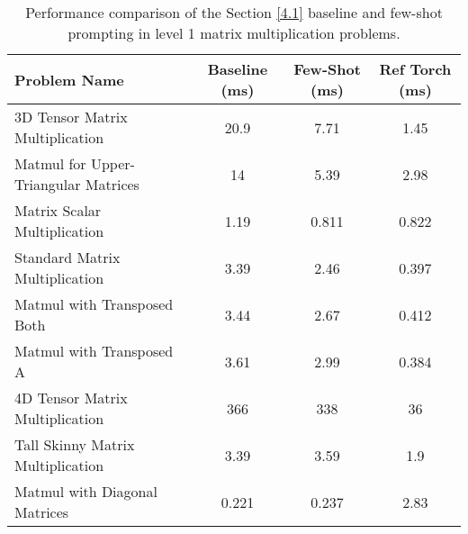 \begin{table}[H]
\centering
\label{tab:few_shot_kernel_fusion_results_level1}
\begin{tabular}{lccc}
    \toprule
    \textbf{Problem Name} & \textbf{Baseline (ms)} & \textbf{Few-Shot (ms)} & \textbf{Ref Torch (ms)} \\
    \midrule
    3D Tensor Matrix Multiplication & 20.9 & 7.71 & 1.45 \\
    Matmul for Upper-Triangular Matrices & 14 & 5.39 & 2.98 \\
    Matrix Scalar Multiplication & 1.19 & 0.811 & 0.822 \\
    Standard Matrix Multiplication & 3.39 & 2.46 & 0.397 \\
    Matmul with Transposed Both & 3.44 & 2.67 & 0.412 \\
    Matmul with Transposed A & 3.61 & 2.99 & 0.384 \\
    4D Tensor Matrix Multiplication & 366 & 338 & 36 \\
    Tall Skinny Matrix Multiplication & 3.39 & 3.59 & 1.9 \\
    Matmul with Diagonal Matrices & 0.221 & 0.237 & 2.83 \\
    \bottomrule
\end{tabular}

\caption{Performance comparison of the Section \ref{4.1} baseline and few-shot prompting in level 1 matrix multiplication problems.}

\end{table}